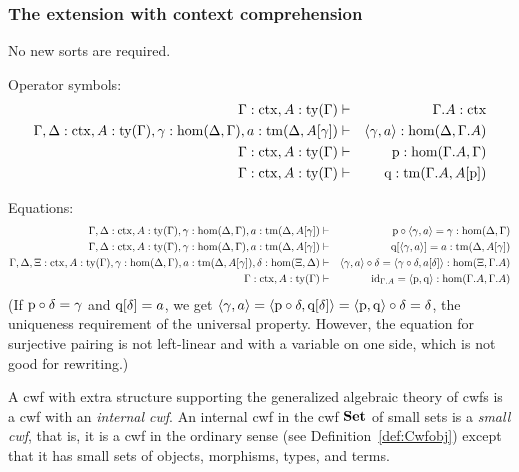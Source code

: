 \documentclass{lmcs}
\def\Hom{\mathrm{hom}}
\def\id{\mathrm{id}}
\newcommand{\ctx}{\mathrm{ctx}}
\newcommand{\ty}{\mathrm{ty}}
\newcommand{\tm}{\mathrm{tm}}
\begin{document}
\subsubsection{The extension with context comprehension}

No new sorts are required.

Operator symbols:
\begin{eqnarray*}
\Gamma : \ctx, A:\ty(\Gamma) &\vdash& \Gamma\cext A : \ctx\\
\Gamma,\Delta : \ctx, A:\ty(\Gamma), \gamma : \Hom(\Delta,\Gamma), a:\tm(\Delta,A[\gamma]) &\vdash& \tuple{\gamma,a} : \Hom(\Delta,\Gamma\cext A)\\
\Gamma : \ctx, A:\ty(\Gamma) &\vdash& \p: \Hom(\Gamma\cext A,\Gamma)\\
\Gamma : \ctx, A:\ty(\Gamma) &\vdash& \q: \tm(\Gamma\cext A,A[\p])
\end{eqnarray*}

Equations:
\begin{eqnarray*}
\Gamma,\Delta : \ctx, A:\ty(\Gamma), \gamma : \Hom(\Delta,\Gamma), a:\tm(\Delta,A[\gamma]) &\vdash& \p\circ\tuple{\gamma,a} = \gamma : \Hom(\Delta,\Gamma)\\
\Gamma,\Delta : \ctx, A:\ty(\Gamma), \gamma : \Hom(\Delta,\Gamma), a:\tm(\Delta,A[\gamma]) &\vdash& \q[\tuple{\gamma,a}] = a : \tm(\Delta,A[\gamma]) \\
\Gamma,\Delta,\Xi : \ctx, A:\ty(\Gamma), \gamma : \Hom(\Delta,\Gamma), a:\tm(\Delta,A[\gamma]), \delta : \Hom(\Xi,\Delta) &\vdash&
\tuple{\gamma,a} \circ \delta = \tuple{\gamma\circ\delta,a[\delta]} :
\Hom(\Xi,\Gamma\cext A) \\
\Gamma : \ctx, A:\ty(\Gamma) &\vdash&
\id_{\Gamma\cext A} = \tuple{\p,\q} : \Hom(\Gamma\cext A,\Gamma\cext A)
\end{eqnarray*}
(If $\mathrm{p}\circ\delta = \gamma$ and $\mathrm{q}[\delta]=a$, we get
$\langle \gamma,a \rangle=\langle \mathrm{p}\circ\delta, \mathrm{q}[\delta] \rangle = \langle \mathrm{p},\mathrm{q} \rangle\circ\delta =
\delta$, the uniqueness requirement of the universal property.
However, the equation for surjective pairing is not left-linear and with
a variable on one side, which is not good for rewriting.)

A cwf with extra structure supporting the generalized algebraic theory of cwfs is a cwf with an
\emph{internal cwf}. An internal cwf in the cwf ${\bf Set}$ of small sets is a {\em small cwf},
that is, it is a cwf in the ordinary sense (see Definition~\ref{def:Cwfobj})
except that it has small sets of objects, morphisms, types, and terms.
\end{document}
